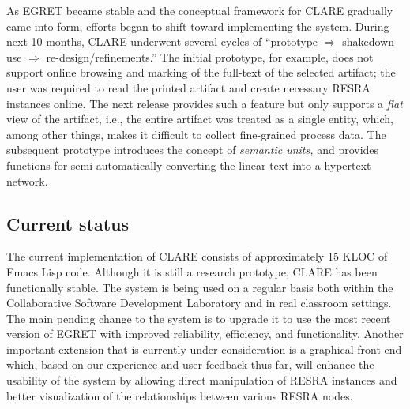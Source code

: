 As EGRET became stable and the conceptual framework for CLARE gradually
came into form, efforts began to shift toward implementing the system.
During next 10-months, CLARE underwent several cycles of ``prototype \(
{\Rightarrow} \) shakedown use \( {\Rightarrow} \) re-design/refinements.''
The initial prototype, for example, does not support online browsing and
marking of the full-text of the selected artifact; the user was required to
read the printed artifact and create necessary RESRA instances online. The
next release provides such a feature but only supports a {\it flat\/} view
of the artifact, i.e., the entire artifact was treated as a single entity,
which, among other things, makes it difficult to collect fine-grained
process data. The subsequent prototype introduces the concept of {\it semantic
units,\/} and provides functions for semi-automatically converting the
linear text into a hypertext network.


\subsection{Current status}
\label{sec:status}

The current implementation of CLARE consists of approximately 15 KLOC of
Emacs Lisp code. Although it is still a research prototype, CLARE has been
functionally stable. The system is being used on a regular basis both
within the Collaborative Software Development Laboratory and in real
classroom settings. The main pending change to the system is to upgrade it
to use the most recent version of EGRET with improved reliability,
efficiency, and functionality. Another important extension that is
currently under consideration is a graphical front-end which, based on our
experience and user feedback thus far, will enhance the usability of the
system by allowing direct manipulation of RESRA instances and better
visualization of the relationships between various RESRA nodes.







